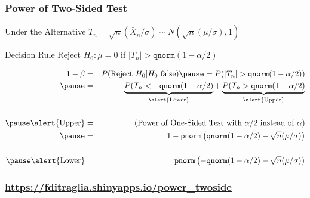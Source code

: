\begin{frame}
	\frametitle{Power of Two-Sided Test}
\footnotesize
\begin{block}
	{Under the Alternative}
	$T_n = \sqrt{n}(\bar{X}_n/\sigma) \sim N\left( \sqrt{n}(\mu/\sigma),1  \right)$
\end{block}
\begin{block}
	{Decision Rule}
	Reject $H_0\colon \mu = 0$ if $|T_n|> \texttt{qnorm}(1- \alpha/2)$  
\end{block}
\begin{eqnarray*}
	1 - \beta &=& P(\mbox{Reject } H_0|H_0 \mbox{ false}) \pause = P(|T_n| >\texttt{qnorm}(1- \alpha/2))\\ \pause
		&=&\underbrace{P(T_n < -\texttt{qnorm}(1- \alpha/2)}_{\text{\alert{Lower}}} + \underbrace{P(T_n >\texttt{qnorm}(1- \alpha/2)}_{\text{\alert{Upper}}}\\ \\ \pause
	\mbox{\alert{Upper}} &=& (\mbox{Power of One-Sided Test with } \alpha/2 \mbox{ instead of } \alpha)\\ \pause
		&=& 1 - \texttt{pnorm}\left( \texttt{qnorm}(1 - \alpha/2) - \sqrt{n}(\mu/\sigma) \right) \\ \\ \pause
	\mbox{\alert{Lower}} &=& \texttt{pnorm}\left(-\texttt{qnorm}(1 - \alpha/2) - \sqrt{n}(\mu/\sigma) \right) \\
\end{eqnarray*}

\end{frame}
\begin{frame}
	\frametitle{\href{https://fditraglia.shinyapps.io/power_twoside}{https://fditraglia.shinyapps.io/power\_twoside}}

\begin{figure}
\end{figure}

\end{frame}
